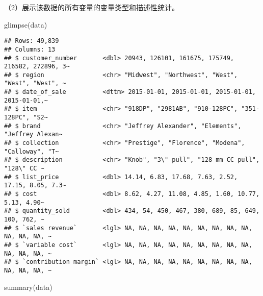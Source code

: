 \documentclass[
]{article}
\newenvironment{Shaded}{\begin{snugshade}}{\end{snugshade}}
\newcommand{\FunctionTok}[1]{\textcolor[rgb]{0.00,0.00,0.00}{#1}}
\newcommand{\NormalTok}[1]{#1}
\begin{document}
（2）展⽰该数据的所有变量的变量类型和描述性统计。

\begin{Shaded}
\begin{Highlighting}[]
\FunctionTok{glimpse}\NormalTok{(data)}
\end{Highlighting}
\end{Shaded}

\begin{verbatim}
## Rows: 49,839
## Columns: 13
## $ customer_number       <dbl> 20943, 126101, 161675, 175749, 216582, 272896, 3~
## $ region                <chr> "Midwest", "Northwest", "West", "West", "West", ~
## $ date_of_sale          <dttm> 2015-01-01, 2015-01-01, 2015-01-01, 2015-01-01,~
## $ item                  <chr> "918DP", "2981AB", "910-128PC", "351-128PC", "S2~
## $ brand                 <chr> "Jeffrey Alexander", "Elements", "Jeffrey Alexan~
## $ collection            <chr> "Prestige", "Florence", "Modena", "Calloway", "T~
## $ description           <chr> "Knob", "3\" pull", "128 mm CC pull", "128\" CC ~
## $ list_price            <dbl> 14.14, 6.83, 17.68, 7.63, 2.52, 17.15, 8.05, 7.3~
## $ cost                  <dbl> 8.62, 4.27, 11.08, 4.85, 1.60, 10.77, 5.13, 4.90~
## $ quantity_sold         <dbl> 434, 54, 450, 467, 380, 689, 85, 649, 100, 762, ~
## $ `sales revenue`       <lgl> NA, NA, NA, NA, NA, NA, NA, NA, NA, NA, NA, NA, ~
## $ `variable cost`       <lgl> NA, NA, NA, NA, NA, NA, NA, NA, NA, NA, NA, NA, ~
## $ `contribution margin` <lgl> NA, NA, NA, NA, NA, NA, NA, NA, NA, NA, NA, NA, ~
\end{verbatim}

\begin{Shaded}
\begin{Highlighting}[]
\FunctionTok{summary}\NormalTok{(data)}
\end{Highlighting}
\end{Shaded}
\end{document}
